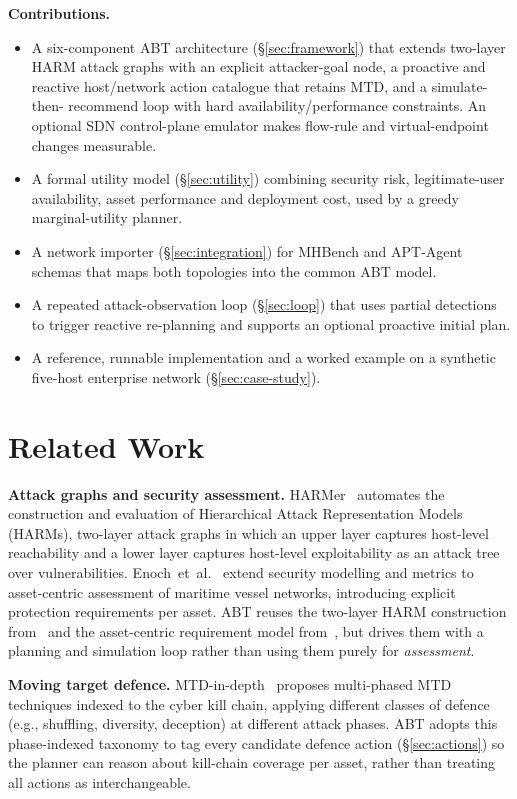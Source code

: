 \documentclass[conference]{IEEEtran}
\begin{document}
\textbf{Contributions.}
\begin{itemize}
\item A six-component ABT architecture (\S\ref{sec:framework}) that extends
  two-layer HARM attack graphs with an explicit attacker-goal node, a proactive and
  reactive host/network action catalogue that retains MTD, and a simulate-then-
  recommend loop with hard availability/performance constraints. An optional SDN
  control-plane emulator makes flow-rule and virtual-endpoint changes measurable.
\item A formal utility model (\S\ref{sec:utility}) combining security risk,
  legitimate-user availability, asset performance and deployment cost, used by a
  greedy marginal-utility planner.
\item A network importer (\S\ref{sec:integration}) for MHBench and APT-Agent schemas
  that maps both topologies into the common ABT model.
\item A repeated attack-observation loop (\S\ref{sec:loop}) that uses partial
  detections to trigger reactive re-planning and supports an optional proactive
  initial plan.
\item A reference, runnable implementation and a worked example on a synthetic
  five-host enterprise network (\S\ref{sec:case-study}).
\end{itemize}

\section{Related Work}
\label{sec:related}

\textbf{Attack graphs and security assessment.} HARMer~\cite{harmer2020} automates
the construction and evaluation of Hierarchical Attack Representation Models (HARMs),
two-layer attack graphs in which an upper layer captures host-level reachability and
a lower layer captures host-level exploitability as an attack tree over vulnerabilities.
Enoch~et~al.~\cite{maritime2021} extend security modelling and metrics to asset-centric
assessment of maritime vessel networks, introducing explicit protection requirements
per asset. ABT reuses the two-layer HARM construction from~\cite{harmer2020} and the
asset-centric requirement model from~\cite{maritime2021}, but drives them with a
planning and simulation loop rather than using them purely for \emph{assessment}.

\textbf{Moving target defence.} MTD-in-depth~\cite{mtdindepth2026} proposes
multi-phased MTD techniques indexed to the cyber kill chain, applying different
classes of defence (e.g., shuffling, diversity, deception) at different attack phases.
ABT adopts this phase-indexed taxonomy to tag every candidate defence action
(\S\ref{sec:actions}) so the planner can reason about kill-chain coverage per asset,
rather than treating all actions as interchangeable.
\end{document}
